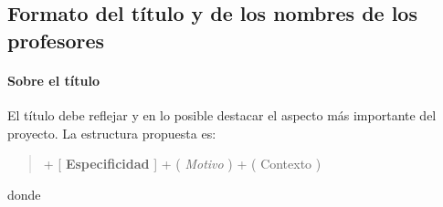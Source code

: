 \subsection*{Formato del título y de los nombres de los profesores}\label{S:titulo_profesores}

\paragraph{Sobre el título}

El título debe reflejar y en lo posible destacar el aspecto más importante del proyecto. La estructura propuesta es:

\begin{quote}
 + [ \textbf{Especificidad} ] + ( \textit{Motivo} ) + ( \textsf{Contexto} )
\end{quote}

donde

